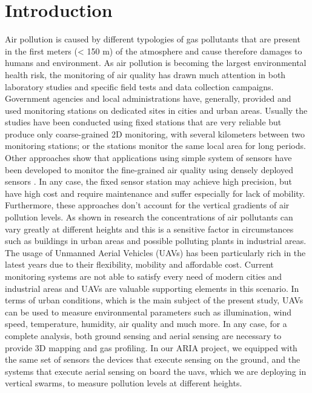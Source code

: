 \chapter{Introduction}
Air pollution is caused by different typologies of gas pollutants that are present in the first meters (< 150 m) of the atmosphere and cause therefore damages to humans and environment. As air pollution is becoming the largest environmental health risk, the monitoring of air quality has drawn much attention in both laboratory studies and specific field tests and data collection campaigns. Government agencies and local administrations have, generally, provided and used monitoring stations on dedicated sites in cities and urban areas. Usually the studies have been conducted using fixed stations that are very reliable but produce only coarse-grained 2D monitoring, with several kilometers between two monitoring stations; or the stations monitor the same local area for long periods.
Other approaches show that applications using simple system of sensors have been developed to monitor the fine-grained air quality using densely deployed sensors \cite{8718193}\cite{8682518}. In any case, the fixed sensor station may achieve high precision, but have high cost and require maintenance and suffer especially for lack of mobility.
Furthermore, these approaches don't account for the vertical gradients of air pollution levels. As shown in research \cite{wu2014mapping}\cite{neuberger1954vertical} the concentrations of air pollutants can vary greatly at different heights and this is a sensitive factor in circumstances such as buildings in urban areas and possible polluting plants in industrial areas.
The usage of Unmanned Aerial Vehicles (UAVs) has been particularly rich in the latest years due to their flexibility, mobility and affordable cost. Current monitoring systems are not able to satisfy every need of modern cities and industrial areas and UAVs are valuable supporting elements in this scenario.
In terms of urban conditions, which is the main subject of the present study, UAVs can be used to measure environmental parameters such as illumination, wind speed, temperature, humidity, air quality and much more. In any case, for a complete analysis, both ground sensing and aerial sensing are necessary to provide 3D mapping and gas profiling. In our ARIA project, we equipped with the same set of sensors the devices that execute sensing on the ground, and the systems that execute aerial sensing on board the \gls{uavs}, which we are deploying in vertical swarms, to measure pollution levels at different heights.
